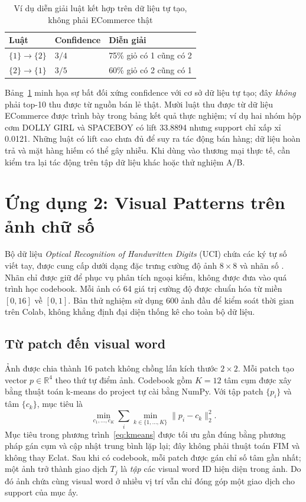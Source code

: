 \documentclass[conference,10pt]{IEEEtran}
\begin{document}
\begin{table}[t]
\centering\caption{Ví dụ diễn giải luật kết hợp trên dữ liệu tự tạo, không phải ECommerce thật}\label{tab:ruleexample}
\begin{tabular}{@{}lll@{}}\toprule
Luật & Confidence & Diễn giải\\\midrule
$\{1\}\to\{2\}$ & $3/4$ & 75\% giỏ có 1 cũng có 2\\
$\{2\}\to\{1\}$ & $3/5$ & 60\% giỏ có 2 cũng có 1\\\bottomrule
\end{tabular}
\end{table}

Bảng~\ref{tab:ruleexample} minh họa sự bất đối xứng confidence với cơ sở dữ liệu tự tạo; đây \emph{không} phải top-10 thu được từ nguồn bán lẻ thật. Mười luật thu được từ dữ liệu ECommerce được trình bày trong bảng kết quả thực nghiệm; ví dụ hai nhóm hộp cơm DOLLY GIRL và SPACEBOY có lift 33.8894 nhưng support chỉ xấp xỉ 0.0121. Những luật có lift cao chưa đủ để suy ra tác động bán hàng; dữ liệu hoàn trả và mặt hàng hiếm có thể gây nhiễu. Khi dùng vào thương mại thực tế, cần kiểm tra lại tác động trên tập dữ liệu khác hoặc thử nghiệm A/B.

\section{Ứng dụng 2: Visual Patterns trên ảnh chữ số}
Bộ dữ liệu \emph{Optical Recognition of Handwritten Digits} (UCI) chứa các ký tự số viết tay, được cung cấp dưới dạng đặc trưng cường độ ảnh $8\times8$ và nhãn số \cite{ucidigits}. Nhãn chỉ được giữ để phục vụ phân tích ngoại kiểm, không được đưa vào quá trình học codebook. Mỗi ảnh có 64 giá trị cường độ được chuẩn hóa từ miền $[0,16]$ về $[0,1]$. Bản thử nghiệm sử dụng 600 ảnh đầu để kiểm soát thời gian trên Colab, không khẳng định đại diện thống kê cho toàn bộ dữ liệu.

\subsection{Từ patch đến visual word}
Ảnh được chia thành 16 patch không chồng lấn kích thước $2\times2$. Mỗi patch tạo vector $p\in\mathbb R^4$ theo thứ tự điểm ảnh. Codebook gồm $K=12$ tâm cụm được xây bằng thuật toán k-means do project tự cài bằng NumPy. Với tập patch $\{p_i\}$ và tâm $\{c_k\}$, mục tiêu là
\begin{equation}\label{eq:kmeans}
\min_{c_1,\ldots,c_K}\sum_i\min_{k\in\{1,\ldots,K\}}\|p_i-c_k\|_2^2.
\end{equation}
Mục tiêu trong phương trình~\eqref{eq:kmeans} được tối ưu gần đúng bằng phương pháp gán cụm và cập nhật trung bình lặp lại; đây không phải thuật toán FIM và không thay Eclat. Sau khi có codebook, mỗi patch được gán chỉ số tâm gần nhất; một ảnh trở thành giao dịch $T_j$ là \emph{tập} các visual word ID hiện diện trong ảnh. Do đó ảnh chứa cùng visual word ở nhiều vị trí vẫn chỉ đóng góp một giao dịch cho support của mục ấy.
\end{document}
